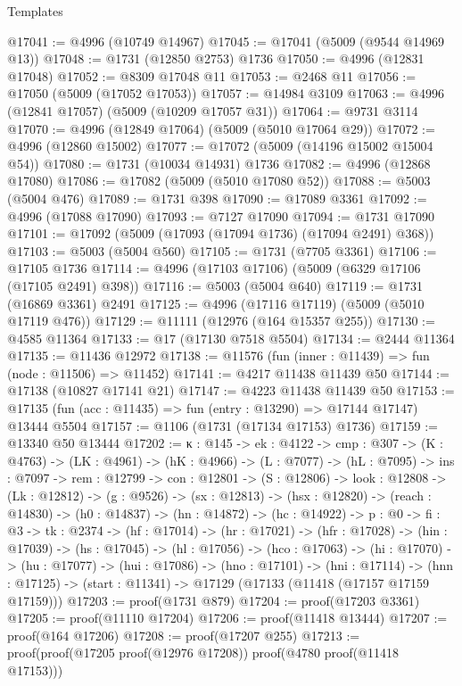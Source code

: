 \begin{lexlean}{Templates}
\begin{coremodule}
@17041 := @4996 (@10749 @14967)
@17045 := @17041 (@5009 (@9544 @14969 @13))
@17048 := @1731 (@12850 @2753) @1736
@17050 := @4996 (@12831 @17048)
@17052 := @8309 @17048 @11
@17053 := @2468 @11
@17056 := @17050 (@5009 (@17052 @17053))
@17057 := @14984 @3109
@17063 := @4996 (@12841 @17057) (@5009 (@10209 @17057 @31))
@17064 := @9731 @3114
@17070 := @4996 (@12849 @17064) (@5009 (@5010 @17064 @29))
@17072 := @4996 (@12860 @15002)
@17077 := @17072 (@5009 (@14196 @15002 @15004 @54))
@17080 := @1731 (@10034 @14931) @1736
@17082 := @4996 (@12868 @17080)
@17086 := @17082 (@5009 (@5010 @17080 @52))
@17088 := @5003 (@5004 @476)
@17089 := @1731 @398
@17090 := @17089 @3361
@17092 := @4996 (@17088 @17090)
@17093 := @7127 @17090
@17094 := @1731 @17090
@17101 := @17092 (@5009 (@17093 (@17094 @1736) (@17094 @2491) @368))
@17103 := @5003 (@5004 @560)
@17105 := @1731 (@7705 @3361)
@17106 := @17105 @1736
@17114 := @4996 (@17103 @17106) (@5009 (@6329 @17106 (@17105 @2491) @398))
@17116 := @5003 (@5004 @640)
@17119 := @1731 (@16869 @3361) @2491
@17125 := @4996 (@17116 @17119) (@5009 (@5010 @17119 @476))
@17129 := @11111 (@12976 (@164 @15357 @255))
@17130 := @4585 @11364
@17133 := @17 (@17130 @7518 @5504)
@17134 := @2444 @11364
@17135 := @11436 @12972
@17138 := @11576 (fun (inner : @11439) => fun (node : @11506) => @11452)
@17141 := @4217 @11438 @11439 @50
@17144 := @17138 (@10827 @17141 @21)
@17147 := @4223 @11438 @11439 @50
@17153 := @17135 (fun (acc : @11435) => fun (entry : @13290) => @17144 @17147) @13444 @5504
@17157 := @1106 (@1731 (@17134 @17153) @1736)
@17159 := @13340 @50 @13444
@17202 := {κ : @145} ->
  {ek : @4122} ->
  {cmp : @307} ->
  (K : @4763) ->
  (LK : @4961) ->
  (hK : @4966) ->
  (L : @7077) ->
  (hL : @7095) ->
  {ins : @7097} ->
  {rem : @12799} ->
  {con : @12801} ->
  (S : @12806) ->
  {look : @12808} ->
  (Lk : @12812) ->
  (g : @9526) ->
  (sx : @12813) ->
  (hsx : @12820) ->
  (reach : @14830) ->
  (h0 : @14837) ->
  (hn : @14872) ->
  (hc : @14922) ->
  {p : @0} ->
  {fi : @3} ->
  {tk : @2374} ->
  (hf : @17014) ->
  (hr : @17021) ->
  (hfr : @17028) ->
  (hin : @17039) ->
  (hs : @17045) ->
  (hl : @17056) ->
  (hco : @17063) ->
  (hi : @17070) ->
  (hu : @17077) ->
  (hui : @17086) ->
  (hno : @17101) ->
  (hni : @17114) ->
  (hnn : @17125) -> (start : @11341) -> @17129 (@17133 (@11418 (@17157 @17159 @17159)))
@17203 := proof(@1731 @879)
@17204 := proof(@17203 @3361)
@17205 := proof(@11110 @17204)
@17206 := proof(@11418 @13444)
@17207 := proof(@164 @17206)
@17208 := proof(@17207 @255)
@17213 := proof(proof(@17205 proof(@12976 @17208)) proof(@4780 proof(@11418 @17153)))

\end{coremodule}
\end{lexlean}
